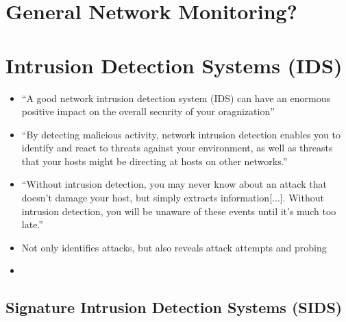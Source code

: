 
\section{General Network Monitoring?}

\section{Intrusion Detection Systems (IDS)}
\label{sec:background:network:ids}

	\begin{itemize}
		\item \enquote{A good network intrusion detection system (IDS) can have an enormous positive impact on the overall security of your oragnization} \parencite{Northcutt2005}
		\item \enquote{By detecting malicious activity, network intrusion detection enables you to identify and react to threats against your environment, as well as threasts that your hosts might be directing at hosts on other networks.} \parencite[p. 201]{Northcutt2005}
		\item \enquote{Without intrusion detection, you may never know about an attack that doesn't damage your host, but simply extracts information[...]. Without intrusion detection, you will be unaware of these events until it's much too late.} \parencite[p. 202]{Northcutt2005}
		\item Not only identifies attacks, but also reveals attack attempts and probing \parencite[p. 202]{Northcutt2005}
		\item 
	\end{itemize}

	\subsection{Signature Intrusion Detection Systems (SIDS)}
	\label{sec:background:network:ids:sig}
	
